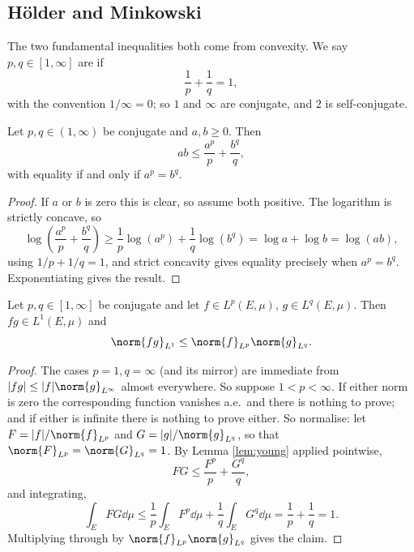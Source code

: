 \documentclass[a4paper]{scrartcl}
\begin{document}
\subsection{H\"older and Minkowski}

The two fundamental inequalities both come from convexity. We say $p, q \in [1,\infty]$ are  if
$$\frac{1}{p} + \frac{1}{q} = 1,$$
with the convention $1/\infty = 0$; so $1$ and $\infty$ are conjugate, and $2$ is self-conjugate.

\begin{lemma}\label{lem:young}
	Let $p, q \in (1,\infty)$ be conjugate and $a, b \ge 0$. Then
	$$ab \le \frac{a^p}{p} + \frac{b^q}{q},$$
	with equality if and only if $a^p = b^q$.
\end{lemma}

\begin{proof}
	If $a$ or $b$ is zero this is clear, so assume both positive. The logarithm is strictly concave, so
	$$\log\left( \frac{a^p}{p} + \frac{b^q}{q} \right) \ge \frac{1}{p} \log(a^p) + \frac{1}{q} \log (b^q) = \log a + \log b = \log(ab),$$
	using $1/p + 1/q = 1$, and strict concavity gives equality precisely when $a^p = b^q$. Exponentiating gives the result.
\end{proof}

\begin{theorem}\label{aof-thm:holder}
	Let $p, q \in [1,\infty]$ be conjugate and let $f \in L^p(E,\mu)$, $g \in L^q(E,\mu)$. Then $fg \in L^1(E,\mu)$ and
	$$\norm{fg}_{L^1} \le \norm{f}_{L^p} \norm{g}_{L^q}.$$
\end{theorem}

\begin{proof}
	The cases $p = 1, q= \infty$ (and its mirror) are immediate from $|fg| \le |f| \norm{g}_{L^\infty}$ almost everywhere. So suppose $1 < p < \infty$. If either norm is zero the corresponding function vanishes a.e.\ and there is nothing to prove; and if either is infinite there is nothing to prove either. So normalise: let $F = |f| / \norm{f}_{L^p}$ and $G = |g|/\norm{g}_{L^q}$, so that $\norm{F}_{L^p} = \norm{G}_{L^q} = 1$. By Lemma \ref{lem:young} applied pointwise,
	$$FG \le \frac{F^p}{p} + \frac{G^q}{q},$$
	and integrating,
	$$\int_E FG \dd\mu \le \frac{1}{p}\int_E F^p \dd \mu + \frac 1q \int_E G^q \dd\mu = \frac 1p + \frac 1q = 1.$$
	Multiplying through by $\norm{f}_{L^p}\norm{g}_{L^q}$ gives the claim.
\end{proof}
\end{document}
